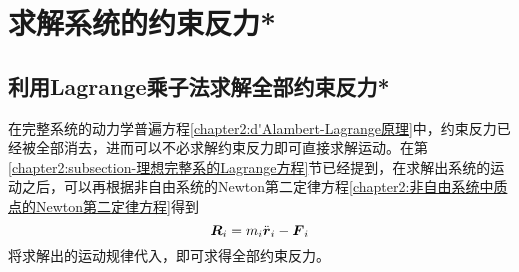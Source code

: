 \section{求解系统的约束反力*}

\subsection{利用Lagrange乘子法求解全部约束反力*}

在完整系统的动力学普遍方程\eqref{chapter2:d'Alambert-Lagrange原理}中，约束反力已经被全部消去，进而可以不必求解约束反力即可直接求解运动。在第\ref{chapter2:subsection-理想完整系的Lagrange方程}节已经提到，在求解出系统的运动之后，可以再根据非自由系统的Newton第二定律方程\eqref{chapter2:非自由系统中质点的Newton第二定律方程}得到
\begin{equation}
	\boldsymbol{R}_i = m_i\ddot{\boldsymbol{r}}_i-\boldsymbol{F}_i
	\label{chapter2:求解全部约束反力-约束反力的定义}
\end{equation}
将求解出的运动规律代入，即可求得全部约束反力。

